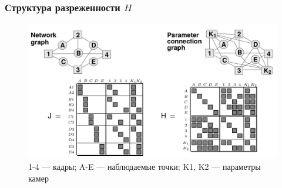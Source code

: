 \documentclass[notheorems,aspectratio=169]{beamer}
\begin{document}
\begin{frame}
  \frametitle{Структура разреженности $H$}
  \begin{figure}
    \includegraphics[height=0.7\textheight, keepaspectratio]{h-struct.png}
    \caption*{1-4 --- кадры; A-E --- наблюдаемые точки; K1, K2 --- параметры камер}
  \end{figure}
\end{frame}
\end{document}
